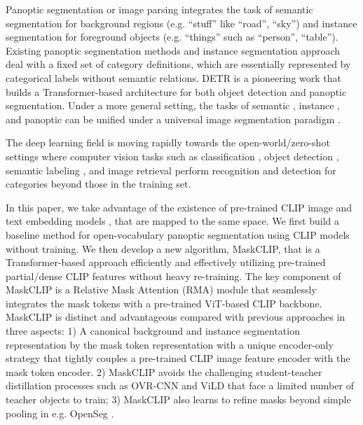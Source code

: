 \documentclass{article}
\theoremstyle{plain}
\theoremstyle{definition}
\theoremstyle{remark}
\begin{document}
Panoptic segmentation  \citep{kirillov2018panoptic} or image parsing  \citep{tu2005image} integrates the task of semantic segmentation  \citep{tu2008auto} for background regions (e.g. ``stuff'' like ``road'', ``sky'') and instance segmentation  \citep{he2017mask} for foreground objects (e.g. ``things'' such as ``person'', ``table''). Existing panoptic segmentation methods  \citep{kirillov2018panoptic,kirillov2019panoptic,li2018attention,xiong2019upsnet,lazarow2020learning} and instance segmentation approach  \citep{he2017mask} deal with a fixed set of category definitions, which are essentially represented by categorical labels without semantic relations. DETR  \citep{carion2020end} is a pioneering work that builds a Transformer-based architecture for both object detection and panoptic segmentation. Under a more general setting, the tasks of semantic \citep{tu2008auto}, instance \citep{he2017mask}, and panoptic \citep{kirillov2018panoptic} can be unified under a universal image segmentation paradigm \citep{cheng2021masked}. 

The deep learning field is moving rapidly towards the open-world/zero-shot settings  \citep{bendale2015towards} where computer vision tasks such as classification \citep{CLIP}, object detection \citep{li2021grounded,zareian2021open,zang2022open,gu2022open,cai2022x}, semantic labeling \citep{li2022language,ghiasi2021open}, and image retrieval  \citep{bendale2015towards,hinami2017discriminative,zareian2021open,hinami2017discriminative,kamath2021mdetr} perform recognition and detection for categories beyond those in the training set.

In this paper, we take advantage of the existence of pre-trained CLIP image and text embedding models \citep{CLIP}, that are mapped to the same space. We first build a baseline method for open-vocabulary panoptic segmentation using CLIP models without training. We then develop a new algorithm, MaskCLIP, that is a Transformer-based approach efficiently and effectively utilizing pre-trained partial/dense CLIP features without heavy re-training. The key component of MaskCLIP is a Relative Mask Attention (RMA) module that seamlessly integrates the mask tokens  with a pre-trained ViT-based CLIP backbone. MaskCLIP is distinct and advantageous compared with previous approaches in three aspects: 
1) A canonical background and instance segmentation representation by the mask token representation with a unique encoder-only strategy that tightly couples a pre-trained CLIP image feature encoder with the mask token encoder.
2) MaskCLIP avoids the challenging student-teacher distillation processes such as OVR-CNN  \citep{zareian2021open} and ViLD  \citep{gu2022open} that face a limited number of teacher objects to train; 3) MaskCLIP also learns to refine masks beyond simple pooling in e.g. OpenSeg  \citep{ghiasi2021open}.
\end{document}
